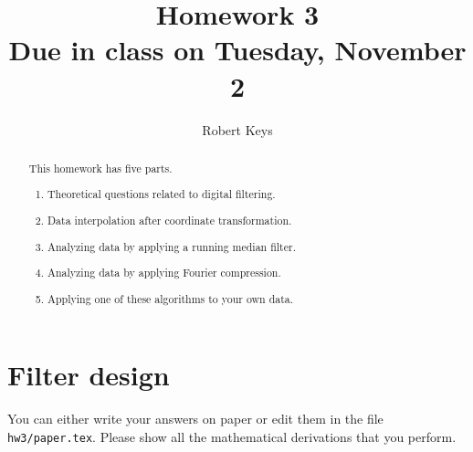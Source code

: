 \author{Robert Keys}
\title{Homework 3 \\ Due in class on Tuesday, November 2}

\begin{abstract}
  This homework has five parts. 
  \begin{enumerate}
  \item Theoretical questions related to digital filtering.
  \item Data interpolation after coordinate transformation.
  \item Analyzing data by applying a running median filter.
  \item Analyzing data by applying Fourier compression.
  \item Applying one of these algorithms to your own data.
  \end{enumerate}
\end{abstract}

\section{Filter design}

You can either write your answers on paper or edit them in the file
\verb#hw3/paper.tex#. Please show all the mathematical
derivations that you perform.

